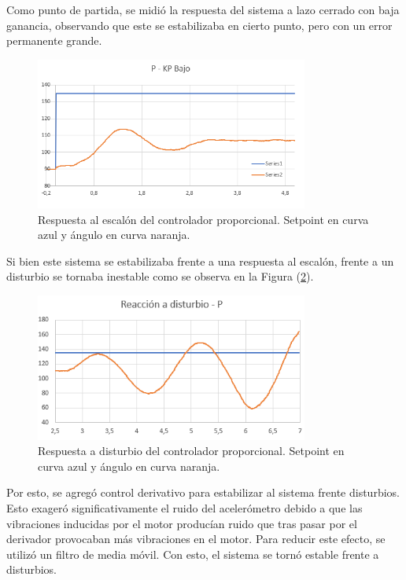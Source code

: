 Como punto de partida, se midió la respuesta del sistema a lazo cerrado con baja ganancia, observando que este se estabilizaba en cierto punto, pero con un error permanente grande. 

\begin{figure}[H]
    \centering
    \includegraphics[width=0.8\textwidth]{./Imagenes/kplow.png}
    \caption{Respuesta al escalón del controlador proporcional. Setpoint en curva azul y ángulo en curva naranja.}
    \label{fig:kplow}
\end{figure}

Si bien este sistema se estabilizaba frente a una respuesta al escalón, frente a un disturbio se tornaba inestable como se observa en la Figura (\ref{fig:kpdist}).

\begin{figure}[H]
    \centering
    \includegraphics[width=0.8\textwidth]{./Imagenes/kpdist.png}
    \caption{Respuesta a disturbio del controlador proporcional. Setpoint en curva azul y ángulo en curva naranja.}
    \label{fig:kpdist}
\end{figure}

Por esto, se agregó control derivativo para estabilizar al sistema frente disturbios. Esto exageró significativamente el ruido del acelerómetro debido a que las vibraciones inducidas por el motor producían ruido que tras pasar por el derivador provocaban más vibraciones en el motor. Para reducir este efecto, se utilizó un filtro de media móvil. Con esto, el sistema se tornó estable frente a disturbios.

